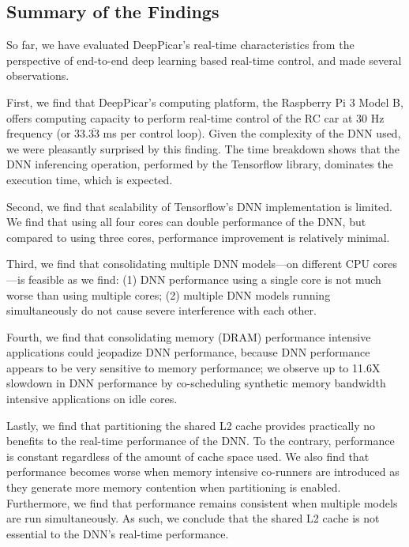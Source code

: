 \subsection{Summary of the Findings}
So far, we have evaluated DeepPicar's real-time
characteristics from the perspective of end-to-end deep learning based
real-time control, and made several observations.

First, we find that DeepPicar's computing platform,
the Raspberry Pi 3 Model B, offers computing capacity to
perform real-time control of the RC car at 30 Hz frequency (or
33.$\overline{\mbox{33}}$ ms  per control loop). Given the complexity of 
the DNN used, we were pleasantly surprised by this finding. 
The time breakdown shows that the DNN inferencing operation, 
performed by the Tensorflow library, dominates the execution time, 
which is expected.

Second, we find that scalability of Tensorflow's DNN 
implementation is limited. We find that using all four cores can double 
performance of the DNN, but compared to using three cores, performance
improvement is relatively minimal.

Third, we find that consolidating multiple DNN models---on different CPU
cores---is feasible as we find: (1) DNN performance using a single
core is not much worse than using multiple cores; (2) multiple DNN
models running simultaneously do not cause severe interference with
each other.

Fourth, we find that consolidating memory (DRAM) performance
intensive applications could jeopadize DNN performance, because DNN
performance appears to be very sensitive to memory performance; we 
observe up to 11.6X slowdown in DNN performance by co-scheduling 
synthetic memory bandwidth intensive applications on idle cores.

Lastly, we find that partitioning the shared L2 cache provides 
practically no benefits to the real-time performance of the DNN. To the 
contrary, performance is constant regardless of the amount of cache 
space used. We also find that performance becomes worse when memory
intensive co-runners are introduced as they generate more memory 
contention when partitioning is enabled. Furthermore, we 
find that performance remains consistent when multiple models are run 
simultaneously. As such, we conclude that the shared L2 cache is not 
essential to the DNN's real-time performance.